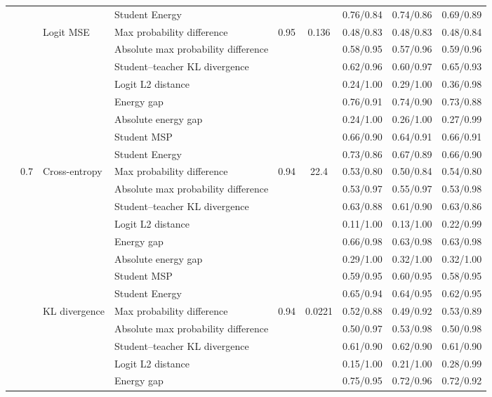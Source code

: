 \documentclass[border=2pt]{standalone}
\begin{document}
\begin{tabular}{llllccccc}
 &  &  & Student Energy &  &  & 0.76/0.84 & 0.74/0.86 & 0.69/0.89 \\
\addlinespace
 &  & Logit MSE & Max probability difference & 0.95 & 0.136 & 0.48/0.83 & 0.48/0.83 & 0.48/0.84 \\
 &  &  & Absolute max probability difference &  &  & 0.58/0.95 & 0.57/0.96 & 0.59/0.96 \\
 &  &  & Student--teacher KL divergence &  &  & 0.62/0.96 & 0.60/0.97 & 0.65/0.93 \\
 &  &  & Logit L2 distance &  &  & 0.24/1.00 & 0.29/1.00 & 0.36/0.98 \\
 &  &  & Energy gap &  &  & 0.76/0.91 & 0.74/0.90 & 0.73/0.88 \\
 &  &  & Absolute energy gap &  &  & 0.24/1.00 & 0.26/1.00 & 0.27/0.99 \\
 &  &  & Student MSP &  &  & 0.66/0.90 & 0.64/0.91 & 0.66/0.91 \\
 &  &  & Student Energy &  &  & 0.73/0.86 & 0.67/0.89 & 0.66/0.90 \\
\addlinespace
 & 0.7 & Cross-entropy & Max probability difference & 0.94 & 22.4 & 0.53/0.80 & 0.50/0.84 & 0.54/0.80 \\
 &  &  & Absolute max probability difference &  &  & 0.53/0.97 & 0.55/0.97 & 0.53/0.98 \\
 &  &  & Student--teacher KL divergence &  &  & 0.63/0.88 & 0.61/0.90 & 0.63/0.86 \\
 &  &  & Logit L2 distance &  &  & 0.11/1.00 & 0.13/1.00 & 0.22/0.99 \\
 &  &  & Energy gap &  &  & 0.66/0.98 & 0.63/0.98 & 0.63/0.98 \\
 &  &  & Absolute energy gap &  &  & 0.29/1.00 & 0.32/1.00 & 0.32/1.00 \\
 &  &  & Student MSP &  &  & 0.59/0.95 & 0.60/0.95 & 0.58/0.95 \\
 &  &  & Student Energy &  &  & 0.65/0.94 & 0.64/0.95 & 0.62/0.95 \\
\addlinespace
 &  & KL divergence & Max probability difference & 0.94 & 0.0221 & 0.52/0.88 & 0.49/0.92 & 0.53/0.89 \\
 &  &  & Absolute max probability difference &  &  & 0.50/0.97 & 0.53/0.98 & 0.50/0.98 \\
 &  &  & Student--teacher KL divergence &  &  & 0.61/0.90 & 0.62/0.90 & 0.61/0.90 \\
 &  &  & Logit L2 distance &  &  & 0.15/1.00 & 0.21/1.00 & 0.28/0.99 \\
 &  &  & Energy gap &  &  & 0.75/0.95 & 0.72/0.96 & 0.72/0.92 \\

\end{tabular}
\end{document}
